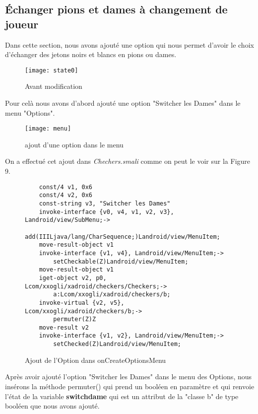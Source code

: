 
\subsection{Échanger pions et dames à changement de joueur}

Dans cette section, nous avons ajouté une option qui nous permet d'avoir le choix d'échanger 
des jetons noirs et blancs en pions ou dames.


\begin{figure}[hp]
	      \begin{center}
			\texttt{[image: state0]}
	      \end{center}
	\caption{Avant modification}
\end{figure}
Pour celà nous avons d'abord ajouté une option "Switcher les Dames" dans le menu "Options". 
\begin{figure}[h!]
	      \begin{center}
			\texttt{[image: menu]}
		  \end{center}
	\caption{ajout d'une option dans le menu}
\end{figure}
On a effectué cet ajout dans \textit{Chechers.smali} comme on peut le voir sur la Figure 9.\newpage

\begin{figure}[h!]
\begin{verbatim}
	const/4 v1, 0x6
    const/4 v2, 0x6
    const-string v3, "Switcher les Dames"
    invoke-interface {v0, v4, v1, v2, v3}, Landroid/view/SubMenu;->
		add(IIILjava/lang/CharSequence;)Landroid/view/MenuItem;
    move-result-object v1
    invoke-interface {v1, v4}, Landroid/view/MenuItem;->
		setCheckable(Z)Landroid/view/MenuItem;
    move-result-object v1
    iget-object v2, p0, Lcom/xxogli/xadroid/checkers/Checkers;->
		a:Lcom/xxogli/xadroid/checkers/b;
    invoke-virtual {v2, v5}, Lcom/xxogli/xadroid/checkers/b;->
		permuter(Z)Z
    move-result v2
    invoke-interface {v1, v2}, Landroid/view/MenuItem;->
		setChecked(Z)Landroid/view/MenuItem;
    \end{verbatim}
    \caption{Ajout de l'Option dans onCreateOptionsMenu}
\end{figure}


Après avoir ajouté l'option "Switcher les Dames" dans le menu des Options, nous insérons la méthode permuter() qui prend 
un booléen en paramètre et qui renvoie l'état de la variable \textbf{switchdame} qui est un attribut de la "classe b" de type booléen que nous avons ajouté.


